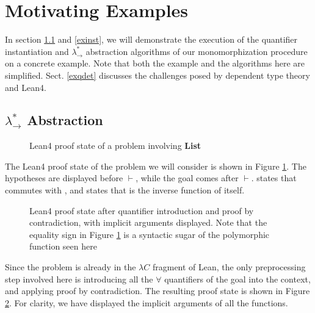 \section{Motivating Examples} \label{motex}

In section \ref{exabst} and \ref{exinst}, we will demonstrate the execution of the
quantifier instantiation and $\lambda_\to^*$ abstraction algorithms of our monomorphization procedure on a
concrete example. Note that both the example and the algorithms
here are simplified. Sect. \ref{exqdet} discusses the challenges posed by dependent
type theory and Lean4.

\subsection{$\lambda_\to^*$ Abstraction} \label{exabst}

\begin{figure}
  \begin{CenteredBox}
    
  \end{CenteredBox}
  \caption{Lean4 proof state of a problem involving \textbf{List}} \label{leanlistpretty}
\end{figure}

The Lean4 proof state of the problem we will consider is shown in Figure \ref{leanlistpretty}.
The hypotheses are displayed before $\vdash$, while the goal comes after $\vdash$.
\vmaprev states that \vmap commutes with \vrev, and
\vrevrev states that \vrev is the inverse function of itself.

\begin{figure}
  \begin{CenteredBox}
    
  \end{CenteredBox}
  \caption{Lean4 proof state after quantifier introduction and proof by contradiction, with implicit arguments displayed.
    Note that the equality sign in Figure \ref{leanlistpretty} is a syntactic sugar of
    the polymorphic function \vEq seen here}
  \label{leanlistexplicit}
\end{figure}

Since the problem is already in the $\lambda C$ fragment of Lean, the only
preprocessing step involved here is introducing all the $\forall$ quantifiers
of the goal into the context, and applying proof by contradiction. The resulting proof state
is shown in Figure \ref{leanlistexplicit}.
For clarity, we have displayed the implicit arguments of all the functions.

